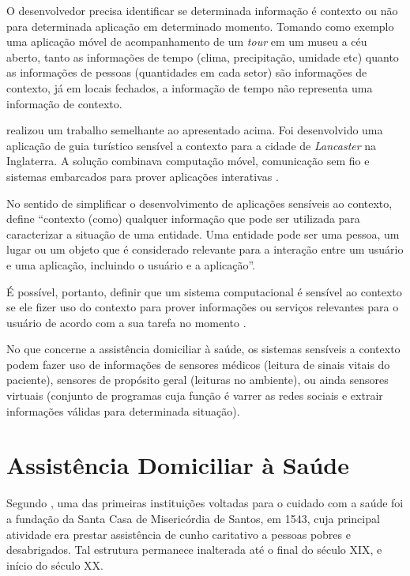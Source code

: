 O desenvolvedor precisa identificar se determinada informação é contexto ou não
para determinada aplicação em determinado momento. Tomando como exemplo uma
aplicação móvel de acompanhamento de um \textit{tour} em um museu a céu aberto, 
tanto as informações de tempo (clima, precipitação, umidade etc) quanto as 
informações de pessoas (quantidades em cada setor) são informações de contexto, 
já em locais fechados, a informação de tempo não representa uma informação de 
contexto.

 realizou um trabalho semelhante ao apresentado
acima. Foi desenvolvido uma aplicação de guia turístico sensível a contexto
para a cidade de \textit{Lancaster} na Inglaterra. A solução combinava
computação móvel, comunicação sem fio e sistemas embarcados para prover
aplicações interativas \cite{davies1999caches}.

No sentido de simplificar o desenvolvimento de aplicações sensíveis ao
contexto,  define ``contexto (como) qualquer
informação que pode ser utilizada para caracterizar a situação de uma entidade.
Uma entidade pode ser uma pessoa, um lugar ou um objeto que é considerado
relevante para a interação entre um usuário e uma aplicação, incluindo o
usuário e a aplicação''.

É possível, portanto, definir que um sistema computacional é sensível ao contexto
se ele fizer uso do contexto para prover informações ou serviços relevantes para
o usuário de acordo com a sua tarefa no momento \cite{dey2001understanding}.

No que concerne a assistência domiciliar à saúde, os sistemas sensíveis a
contexto podem fazer uso de informações de sensores médicos (leitura de sinais 
vitais do paciente), sensores de propósito geral (leituras no ambiente), 
ou ainda sensores virtuais (conjunto de programas cuja função é varrer as redes 
sociais e extrair informações válidas para determinada situação).

\section{Assistência Domiciliar à Saúde} \label{sec:ads}

Segundo , uma das primeiras instituições voltadas para o
cuidado com a saúde foi a fundação da Santa Casa de Misericórdia de Santos, em
1543, cuja principal atividade era prestar assistência de cunho caritativo a
pessoas pobres e desabrigados. Tal estrutura permanece inalterada até o final do
século XIX, e início do século XX.

